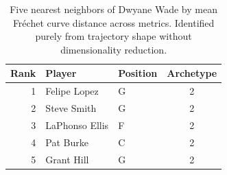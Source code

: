 \begin{table}[htbp]
  \centering\small
  \begin{tabular}{rllc}
    \toprule
    Rank & Player & Position & Archetype \\
    \midrule
    1 & Felipe Lopez & G & 2 \\
    2 & Steve Smith & G & 2 \\
    3 & LaPhonso Ellis & F & 2 \\
    4 & Pat Burke & C & 2 \\
    5 & Grant Hill & G & 2 \\
    \bottomrule
  \end{tabular}
  \caption{Five nearest neighbors of Dwyane Wade by mean Fr\'{e}chet curve distance across metrics. Identified purely from trajectory shape without dimensionality reduction.}
  \label{tab:Dwyane_Wade_frechet_curve_neighbors}
\end{table}

